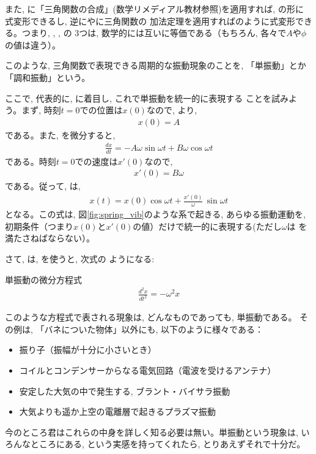 また, 
に「三角関数の合成」(数学リメディアル教材参照)を適用すれば, の形に
式変形できるし, 逆にやに三角関数の
加法定理を適用すればのように式変形できる。つまり, 
, , の
3つは, 数学的には互いに等価である（もちろん, 各々で$A$や$\phi$の値は違う）。

このような, 三角関数で表現できる周期的な振動現象のことを, 「単振動」とか「調和振動」という。

ここで, 代表的に, に着目し, これで単振動を統一的に表現する
ことを試みよう。まず, 時刻$t=0$での位置は$x(0)$なので, より, 
\begin{eqnarray}
x(0)=A
\end{eqnarray}
である。また, を微分すると, 
\begin{eqnarray}
\frac{dx}{dt}=-A\omega\sin\omega t+B\omega\cos\omega t
\end{eqnarray}
である。時刻$t=0$での速度は$x'(0)$なので, 
\begin{eqnarray}
x'(0)=B\omega
\end{eqnarray}
である。従って, は, 
\begin{eqnarray}
x(t)=x(0)\cos\omega t+\frac{x'(0)}{\omega}\,\sin\omega t\label{eq:lincombvib3}
\end{eqnarray}
となる。この式は, 図\ref{fig:spring_vib}のような系で起きる, あらゆる振動運動を, 
初期条件（つまり$x(0)$と$x'(0)$の値）だけで統一的に表現する(ただし$\omega$は
を満たさねばならない）。\mv

さて, は, を使うと, 次式の
ようになる:
\begin{itembox}{単振動の微分方程式}
\begin{eqnarray}
\frac{d^2x}{dt^2}=-\omega^2x\label{eq:vib}
\end{eqnarray}
\end{itembox}
このような方程式で表される現象は, どんなものであっても, 単振動である。
その例は, 「バネについた物体」以外にも, 以下のように様々である：
\begin{itemize}
\item 振り子（振幅が十分に小さいとき）
\item コイルとコンデンサーからなる電気回路（電波を受けるアンテナ）
\item 安定した大気の中で発生する, ブラント・バイサラ振動
\item 大気よりも遥か上空の電離層で起きるプラズマ振動
\end{itemize}
今のところ君はこれらの中身を詳しく知る必要は無い。単振動という現象は, 
いろんなところにある, という実感を持ってくれたら, とりあえずそれで十分だ。

